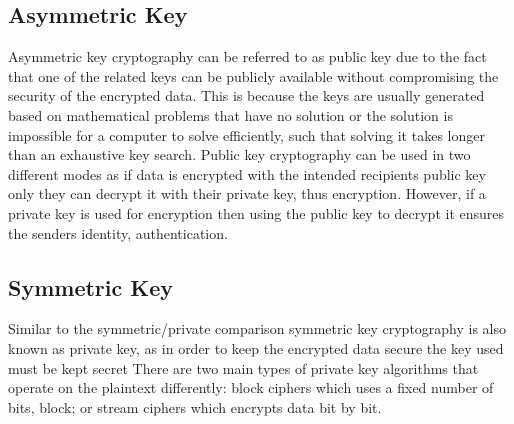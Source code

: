 \documentclass[12pt,twoside,a4paper]{report}
\begin{document}
    
    \subsection{Asymmetric Key}
    Asymmetric key cryptography can be referred to as public key due to the fact that one of the related keys can be publicly available without compromising the security of the encrypted data.
    This is because the keys are usually generated based on mathematical problems that have no solution or the solution is impossible for a computer to solve efficiently, such that solving it takes longer than an exhaustive key search\cite{BruceSchneier2000}.
    Public key cryptography can be used in two different modes as if data is encrypted with the intended recipients public key only they can decrypt it with their private key, thus encryption.
    However, if a private key is used for encryption then using the public key to decrypt it ensures the senders identity, authentication\cite{AlfredJ.Menezes1996}.
    
    \subsection{Symmetric Key}
    Similar to the symmetric/private comparison symmetric key cryptography is also known as private key, as in order to keep the encrypted data secure the key used must be kept secret There are two main types of private key algorithms that operate on the plaintext differently: block ciphers which uses a fixed number of bits, block; or stream ciphers which encrypts data bit by bit\cite{AlfredJ.Menezes1996}.
    
\end{document}
